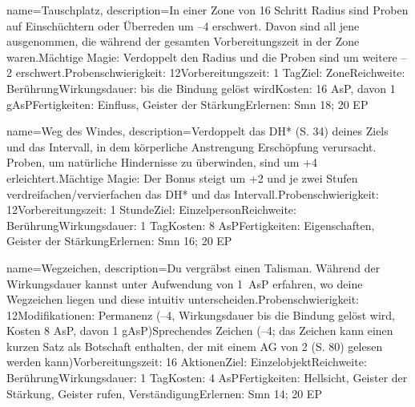 {
    name={Tauschplatz},
    description={In einer Zone von 16 Schritt Radius sind Proben auf Einschüchtern oder Überreden um –4 erschwert. Davon sind all jene ausgenommen, die während der gesamten Vorbereitungszeit in der Zone waren.\newline Mächtige Magie: Verdoppelt den Radius und die Proben sind um weitere –2 erschwert.\newline Probenschwierigkeit: 12\newline Vorbereitungszeit: 1 Tag\newline Ziel: Zone\newline Reichweite: Berührung\newline Wirkungsdauer: bis die Bindung gelöst wird\newline Kosten: 16 AsP, davon 1 gAsP\newline Fertigkeiten: Einfluss, Geister der Stärkung\newline Erlernen: Smn 18; 20 EP}
}


{
    name={Weg des Windes},
    description={Verdoppelt das DH* (S. 34) deines Ziels und das Intervall, in dem körperliche Anstrengung Erschöpfung verursacht. Proben, um natürliche Hindernisse zu überwinden, sind um +4 erleichtert.\newline Mächtige Magie: Der Bonus steigt um +2 und je zwei Stufen verdreifachen/vervierfachen das DH* und das Intervall.\newline Probenschwierigkeit: 12\newline Vorbereitungszeit: 1 Stunde\newline Ziel: Einzelperson\newline Reichweite: Berührung\newline Wirkungsdauer: 1 Tag\newline Kosten: 8 AsP\newline Fertigkeiten: Eigenschaften, Geister der Stärkung\newline Erlernen: Smn 16; 20 EP}
}


{
    name={Wegzeichen},
    description={Du vergräbst einen Talisman. Während der Wirkungsdauer kannst unter Aufwendung von 1 AsP erfahren, wo deine Wegzeichen liegen und diese intuitiv unterscheiden.\newline Probenschwierigkeit: 12\newline Modifikationen: Permanenz (–4, Wirkungsdauer bis die Bindung gelöst wird, Kosten 8 AsP, davon 1 gAsP)\newline Sprechendes Zeichen (–4; das Zeichen kann einen kurzen Satz als Botschaft enthalten, der mit einem AG von 2 (S. 80) gelesen werden kann)\newline Vorbereitungszeit: 16 Aktionen\newline Ziel: Einzelobjekt\newline Reichweite: Berührung\newline Wirkungsdauer: 1 Tag\newline Kosten: 4 AsP\newline Fertigkeiten: Hellsicht, Geister der Stärkung, Geister rufen, Verständigung\newline Erlernen: Smn 14; 20 EP}
}


